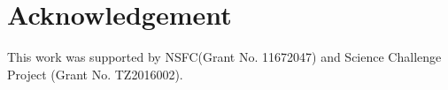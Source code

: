 \documentclass[review]{elsarticle}
\begin{document}
\section*{Acknowledgement}
This work was supported by NSFC(Grant No. 11672047) and Science Challenge Project (Grant No. TZ2016002).


%
\end{document}

